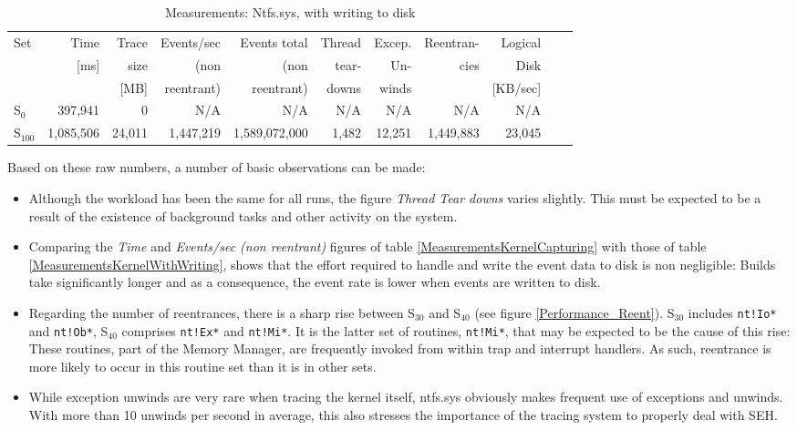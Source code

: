 \begin{table}[h] 
\footnotesize
\addtolength{\tabcolsep}{-2pt}
\caption{Measurements: Ntfs.sys, with writing to disk}
\label{MeasurementsNtfsWithWriting}
\centering          

\begin{tabular}{l r r r r r r r r r r}    
\hline\hline 
Set				&	Time 		&	Trace &	Events/sec	&Events total	&	Thread 		&	Excep. 	&	Reentran-	&	Logical		 \\
					& [ms]		& size & (non					&(non 				&	tear-			& Un-			& cies			& Disk	 \\
					& 				& [MB] & reentrant)		& reentrant)	& downs			&	winds		&						& [KB/sec]				\\
\hline
S$_{0}$   &	397,941	&	0	&	N/A	&	N/A	&	N/A	&	N/A	&	N/A	&	N/A	\\
\hline
S$_{100}$	&	1,085,506	&	24,011	&	1,447,219	&	1,589,072,000	&	1,482	&	12,251	&	1,449,883	&	23,045	\\ 
\hline
\end{tabular}
\end{table}


Based on these raw numbers, a number of basic observations can be made:
\begin{itemize}
	\item Although the workload has been the same for all runs, the figure \emph{Thread Tear downs}
				varies slightly. This must be expected to be a result of the existence of background tasks
				and other activity on the system.
	\item Comparing the \emph{Time} and \emph{Events/sec (non reentrant)} figures of table
				\ref{MeasurementsKernelCapturing} with those of table \ref{MeasurementsKernelWithWriting},
				shows that the effort required to handle and write the event data to disk is
				non negligible: Builds take significantly longer and as a consequence, the event rate
				is lower when events are written to disk.
	\item Regarding the number of reentrances, there is a sharp rise between S$_{30}$ and
				S$_{40}$ (see figure \ref{Performance_Reent}). 
				S$_{30}$ includes \verb|nt!Io*| and \verb|nt!Ob*|, S$_{40}$ comprises \verb|nt!Ex*| and \verb|nt!Mi*|. 
				It is the latter set of routines, \verb|nt!Mi*|, that may be expected to be the cause of this
				rise: These routines, part of the Memory Manager, are frequently invoked from within
				trap and interrupt handlers. As such, reentrance is more likely to occur
				in this routine set than it is in other sets.
	\item While exception unwinds are very rare when tracing the kernel itself, ntfs.sys
				obviously makes frequent use of exceptions and unwinds. With more than 10 unwinds 
				per second in average, this also stresses the importance of the tracing system to 
				properly deal with SEH.
\end{itemize}

